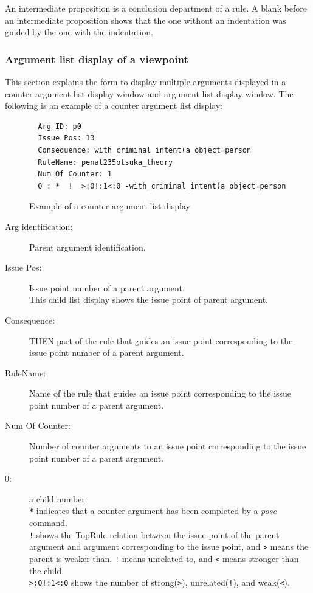 An intermediate proposition is a conclusion department of a rule.
A blank before an intermediate proposition shows that the one without an indentation was guided by the one with the indentation.

\subsubsection{Argument list display of a viewpoint}\label{Argument list display of a viewpoint}

This section explains the form to display multiple arguments displayed in a counter argument list display window and argument list display window.
The following is an example of a counter argument list display:

\begin{figure}[htb]
\begin{verbatim}
  Arg ID: p0
  Issue Pos: 13
  Consequence: with_criminal_intent(a_object=person
  RuleName: penal235otsuka_theory
  Num Of Counter: 1
  0 : *  !  >:0!:1<:0 -with_criminal_intent(a_object=person
\end{verbatim}
\caption{Example of a counter argument list display}\label{Example of a counter argument list display}
\end{figure}

\begin{description}
\item[Arg identification:] Parent argument identification.
\item[Issue Pos:] Issue point number of a parent argument.\\
This child list display shows the issue point of parent argument.
\item[Consequence:] THEN part of the rule that guides an issue point corresponding to the issue point number of a parent argument.
\item[RuleName:] Name of the rule that guides an issue point corresponding to the issue point number of a parent argument.
\item[Num Of Counter:] Number of counter arguments to an issue point corresponding to the issue point number of a parent argument.
\item[0:] a child number.\\
\verb+*+ indicates that a counter argument has been completed by a {\sl pose} command.\\
\verb+!+ shows the TopRule relation between the issue point of the parent argument and argument corresponding to the issue point, and \verb+>+ means the parent is weaker than, \verb+!+ means unrelated to, and \verb+<+ means stronger than the child.\\
\verb+>:0!:1<:0+ shows the number of strong(\verb+>+), unrelated(\verb+!+), and weak(\verb+<+).
\end{description}

